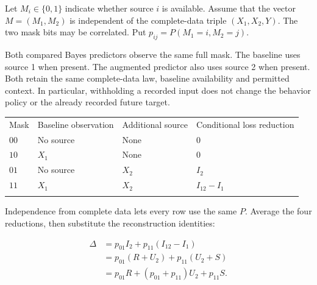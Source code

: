 \documentclass[11pt,a4paper]{article}
\newcounter{none}
\begin{document}
Let \(M_i\in\{0,1\}\) indicate whether source \(i\) is available. Assume that the vector \(M=(M_1,M_2)\) is independent of the complete-data triple \((X_1,X_2,Y)\). The two mask bits may be correlated. Put \(p_{ij}=P(M_1=i,M_2=j)\).

Both compared Bayes predictors observe the same full mask. The baseline uses source 1 when present. The augmented predictor also uses source 2 when present. Both retain the same complete-data law, baseline availability and permitted context. In particular, withholding a recorded input does not change the behavior policy or the already recorded future target.

{\def\LTcaptype{none} %
\begin{longtable}[]{@{}
  >{\raggedright\arraybackslash}p{}
  >{\raggedright\arraybackslash}p{}
  >{\raggedright\arraybackslash}p{}
  >{\raggedright\arraybackslash}p{}@{}}
\toprule\noalign{}
\begin{minipage}[b]{\linewidth}\raggedright
Mask
\end{minipage} & \begin{minipage}[b]{\linewidth}\raggedright
Baseline observation
\end{minipage} & \begin{minipage}[b]{\linewidth}\raggedright
Additional source
\end{minipage} & \begin{minipage}[b]{\linewidth}\raggedright
Conditional loss reduction
\end{minipage} \\*
\midrule\noalign{}
\endhead
\bottomrule\noalign{}
\endfoot
\(00\) & No source & None & \(0\) \\*
\(10\) & \(X_1\) & None & \(0\) \\*
\(01\) & No source & \(X_2\) & \(I_2\) \\*
\(11\) & \(X_1\) & \(X_2\) & \(I_{12}-I_1\) \\*
\end{longtable}
}

Independence from complete data lets every row use the same \(P\). Average the four reductions, then substitute the reconstruction identities:

\[
\begin{aligned}
\Delta&=p_{01}I_2+p_{11}(I_{12}-I_1)\\
&=p_{01}(R+U_2)+p_{11}(U_2+S)\\
&=\boxed{p_{01}R+(p_{01}+p_{11})U_2+p_{11}S}.
\end{aligned}
\]
\end{document}
